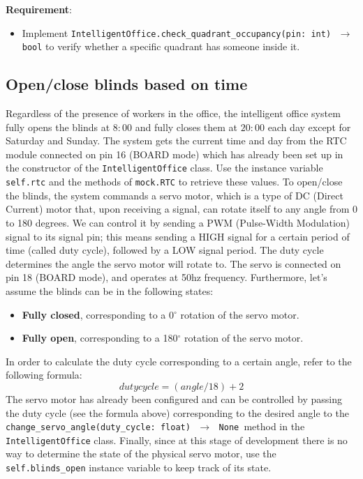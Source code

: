 \noindent\textbf{Requirement}:
\begin{itemize}
    \item Implement \texttt{IntelligentOffice.check\_quadrant\_occupancy(pin: int) $\,\to\,$ bool} to verify whether a specific quadrant has someone inside it.
\end{itemize}


\subsection*{Open/close blinds based on time}
Regardless of the presence of workers in the office, the intelligent office system fully opens the blinds at $8:00$ and fully closes them at $20:00$ each day except for Saturday and Sunday.
The system gets the current time and day from the RTC module connected on pin 16 (BOARD mode) which has already been set up in the constructor of  the \texttt{IntelligentOffice} class. Use the instance variable \texttt{self.rtc} and the methods of \texttt{mock.RTC} to retrieve these values.
To open/close the blinds, the system commands a servo motor, which is a type of DC (Direct Current) motor that, upon receiving a signal, can rotate itself to any angle from 0 to 180 degrees. We can control it by sending a PWM (Pulse-Width Modulation) signal to its signal pin; this means sending a HIGH signal for a certain period of time (called duty cycle), followed by a LOW signal period. The duty cycle determines the angle the servo motor will rotate to.
The servo is connected on pin 18 (BOARD mode), and operates at 50hz frequency. Furthermore, let's assume the blinds can be in the following states:
\begin{itemize}
    \item \textbf{Fully closed}, corresponding to a 0$^{\circ}$ rotation of the servo motor.
    \item \textbf{Fully open}, corresponding to a 180$^{\circ}$ rotation of the servo motor.
\end{itemize}

In order to calculate the duty cycle corresponding to a certain angle, refer to the following formula:
\[
    duty cycle = (angle / 18) + 2
\]
The servo motor has already been configured and can be controlled by passing the duty cycle (see the formula above) corresponding to the desired angle to the \texttt{change\_servo\_angle(duty\_cycle: float) $\,\to\,$ None }method in the \texttt{IntelligentOffice} class.
Finally, since at this stage of development there is no way to determine the state of the physical servo motor, use the \texttt{self.blinds\_open} instance variable to keep track of its state.

